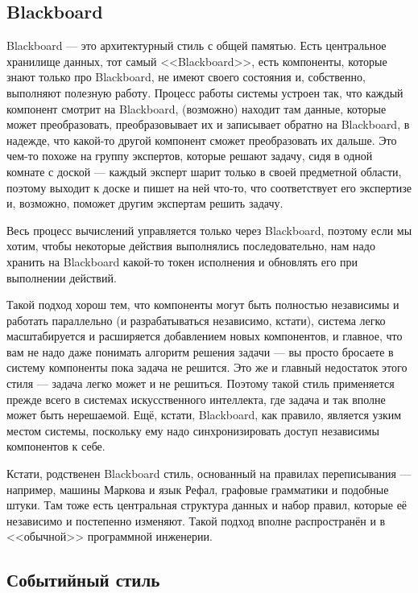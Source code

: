 \documentclass[a5paper]{article}
\begin{document}
\subsection{Blackboard}

Blackboard --- это архитектурный стиль с общей памятью. Есть центральное хранилище данных, тот самый <<Blackboard>>, есть компоненты, которые знают только про Blackboard, не имеют своего состояния и, собственно, выполняют полезную работу. Процесс работы системы устроен так, что каждый компонент смотрит на Blackboard, (возможно) находит там данные, которые может преобразовать, преобразовывает их и записывает обратно на Blackboard, в надежде, что какой-то другой компонент сможет преобразовать их дальше. Это чем-то похоже на группу экспертов, которые решают задачу, сидя в одной комнате с доской --- каждый эксперт шарит только в своей предметной области, поэтому выходит к доске и пишет на ней что-то, что соответствует его экспертизе и, возможно, поможет другим экспертам решить задачу. 

Весь процесс вычислений управляется только через Blackboard, поэтому если мы хотим, чтобы некоторые действия выполнялись последовательно, нам надо хранить на Blackboard какой-то токен исполнения и обновлять его при выполнении действий.

Такой подход хорош тем, что компоненты могут быть полностью независимы и работать параллельно (и разрабатываться независимо, кстати), система легко масштабируется и расширяется добавлением новых компонентов, и главное, что вам не надо даже понимать алгоритм решения задачи --- вы просто бросаете в систему компоненты пока задача не решится. Это же и главный недостаток этого стиля --- задача легко может и не решиться. Поэтому такой стиль применяется прежде всего в системах искусственного интеллекта, где задача и так вполне может быть нерешаемой. Ещё, кстати, Blackboard, как правило, является узким местом системы, поскольку ему надо синхронизировать доступ независимы компонентов к себе.

Кстати, родственен Blackboard стиль, основанный на правилах переписывания --- например, машины Маркова и язык Рефал, графовые грамматики и подобные штуки. Там тоже есть центральная структура данных и набор правил, которые её независимо и постепенно изменяют. Такой подход вполне распространён и в <<обычной>> программной инженерии.

\subsection{Событийный стиль}
\end{document}
